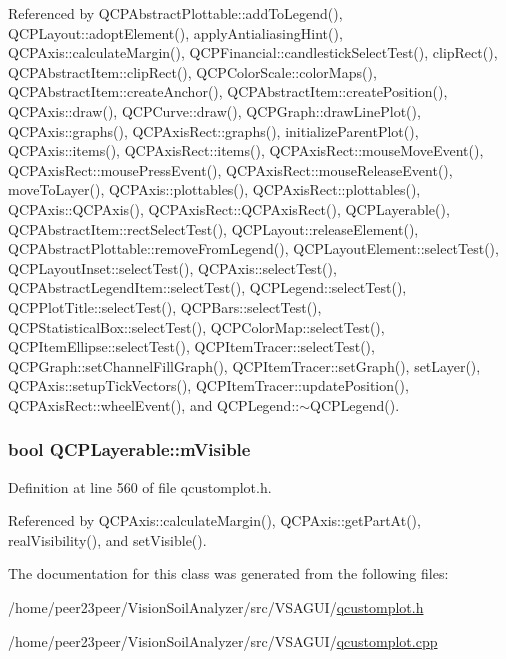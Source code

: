 Referenced by Q\+C\+P\+Abstract\+Plottable\+::add\+To\+Legend(), Q\+C\+P\+Layout\+::adopt\+Element(), apply\+Antialiasing\+Hint(), Q\+C\+P\+Axis\+::calculate\+Margin(), Q\+C\+P\+Financial\+::candlestick\+Select\+Test(), clip\+Rect(), Q\+C\+P\+Abstract\+Item\+::clip\+Rect(), Q\+C\+P\+Color\+Scale\+::color\+Maps(), Q\+C\+P\+Abstract\+Item\+::create\+Anchor(), Q\+C\+P\+Abstract\+Item\+::create\+Position(), Q\+C\+P\+Axis\+::draw(), Q\+C\+P\+Curve\+::draw(), Q\+C\+P\+Graph\+::draw\+Line\+Plot(), Q\+C\+P\+Axis\+::graphs(), Q\+C\+P\+Axis\+Rect\+::graphs(), initialize\+Parent\+Plot(), Q\+C\+P\+Axis\+::items(), Q\+C\+P\+Axis\+Rect\+::items(), Q\+C\+P\+Axis\+Rect\+::mouse\+Move\+Event(), Q\+C\+P\+Axis\+Rect\+::mouse\+Press\+Event(), Q\+C\+P\+Axis\+Rect\+::mouse\+Release\+Event(), move\+To\+Layer(), Q\+C\+P\+Axis\+::plottables(), Q\+C\+P\+Axis\+Rect\+::plottables(), Q\+C\+P\+Axis\+::\+Q\+C\+P\+Axis(), Q\+C\+P\+Axis\+Rect\+::\+Q\+C\+P\+Axis\+Rect(), Q\+C\+P\+Layerable(), Q\+C\+P\+Abstract\+Item\+::rect\+Select\+Test(), Q\+C\+P\+Layout\+::release\+Element(), Q\+C\+P\+Abstract\+Plottable\+::remove\+From\+Legend(), Q\+C\+P\+Layout\+Element\+::select\+Test(), Q\+C\+P\+Layout\+Inset\+::select\+Test(), Q\+C\+P\+Axis\+::select\+Test(), Q\+C\+P\+Abstract\+Legend\+Item\+::select\+Test(), Q\+C\+P\+Legend\+::select\+Test(), Q\+C\+P\+Plot\+Title\+::select\+Test(), Q\+C\+P\+Bars\+::select\+Test(), Q\+C\+P\+Statistical\+Box\+::select\+Test(), Q\+C\+P\+Color\+Map\+::select\+Test(), Q\+C\+P\+Item\+Ellipse\+::select\+Test(), Q\+C\+P\+Item\+Tracer\+::select\+Test(), Q\+C\+P\+Graph\+::set\+Channel\+Fill\+Graph(), Q\+C\+P\+Item\+Tracer\+::set\+Graph(), set\+Layer(), Q\+C\+P\+Axis\+::setup\+Tick\+Vectors(), Q\+C\+P\+Item\+Tracer\+::update\+Position(), Q\+C\+P\+Axis\+Rect\+::wheel\+Event(), and Q\+C\+P\+Legend\+::$\sim$\+Q\+C\+P\+Legend().

\hypertarget{class_q_c_p_layerable_a62e3aed8427d6ce3ccf716f285106cb3}{}
\subsubsection[{m\+Visible}]{\setlength{\rightskip}{0pt plus 5cm}bool Q\+C\+P\+Layerable\+::m\+Visible\hspace{0.3cm}{\ttfamily [protected]}}\label{class_q_c_p_layerable_a62e3aed8427d6ce3ccf716f285106cb3}


Definition at line 560 of file qcustomplot.\+h.



Referenced by Q\+C\+P\+Axis\+::calculate\+Margin(), Q\+C\+P\+Axis\+::get\+Part\+At(), real\+Visibility(), and set\+Visible().



The documentation for this class was generated from the following files\+:\begin{DoxyCompactItemize}
\item 
/home/peer23peer/\+Vision\+Soil\+Analyzer/src/\+V\+S\+A\+G\+U\+I/\hyperlink{qcustomplot_8h}{qcustomplot.\+h}\item 
/home/peer23peer/\+Vision\+Soil\+Analyzer/src/\+V\+S\+A\+G\+U\+I/\hyperlink{qcustomplot_8cpp}{qcustomplot.\+cpp}\end{DoxyCompactItemize}
